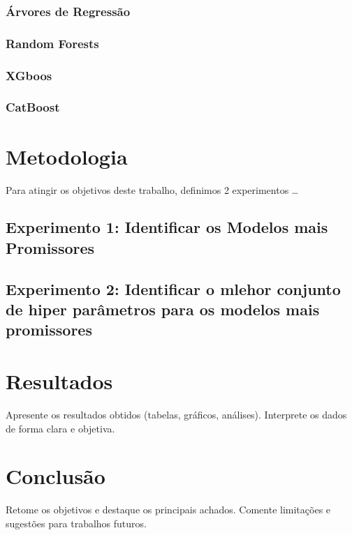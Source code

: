 \documentclass[12pt]{article}
\begin{document}
\subsubsection{Árvores de Regressão}
\subsubsection{Random Forests}
\subsubsection{XGboos}
\subsubsection{CatBoost}

\section{Metodologia}
Para atingir os objetivos deste trabalho, definimos 2 experimentos \dots

\subsection{Experimento 1: Identificar os Modelos mais Promissores}

\subsection{Experimento 2: Identificar o mlehor conjunto de hiper parâmetros para os modelos mais promissores}


\section{Resultados}
Apresente os resultados obtidos (tabelas, gráficos, análises). Interprete os dados de forma clara e objetiva.

\section{Conclusão}
Retome os objetivos e destaque os principais achados. Comente limitações e sugestões para trabalhos futuros.

\newpage
\printbibliography
\end{document}
